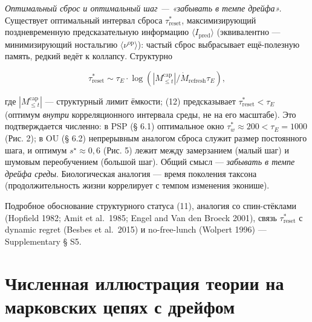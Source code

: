 \documentclass[pdflatex,sn-mathphys-ay]{sn-jnl}
\begin{document}
\emph{Оптимальный сброс и оптимальный шаг --- «забывать в темпе дрейфа».} Существует оптимальный интервал сброса \(\tau_{\text{reset}}^*\), максимизирующий поздневременную предсказательную информацию \(\langle I_{\text{pred}} \rangle\) (эквивалентно --- минимизирующий ностальгию \(\langle\nu^{\text{op}}\rangle\)): частый сброс выбрасывает ещё-полезную память, редкий ведёт к коллапсу. Структурно



\begin{equation}\tau_{\text{reset}}^* \sim \tau_E \cdot \log(|M_{\le t}^{\text{cap}}|/\dot{M}_{\text{refresh}} \tau_E), \tag{12}\end{equation}



где \(|M_{\le t}^{\text{cap}}|\) --- структурный лимит ёмкости; (12) предсказывает \(\tau_{\text{reset}}^* < \tau_E\) (оптимум \emph{внутри} корреляционного интервала среды, не на его масштабе). Это подтверждается численно: в PSP (§ 6.1) оптимальное окно \(\tau_w^* \approx 200 < \tau_E = 1000\) (Рис. 2); в OU (§ 6.2) непрерывным аналогом сброса служит размер постоянного шага, и оптимум \(s^\star \approx 0{,}6\) (Рис. 5) лежит между замерзанием (малый шаг) и шумовым переобучением (большой шаг). Общий смысл --- \emph{забывать в темпе дрейфа среды}. Биологическая аналогия --- время поколения таксона (продолжительность жизни коррелирует с темпом изменения эконише).



Подробное обоснование структурного статуса (11), аналогия со спин-стёклами (Hopfield 1982; Amit et al.~1985; Engel and Van den Broeck 2001), связь \(\tau_{\text{reset}}^*\) с dynamic regret (Besbes et al.~2015) и no-free-lunch (Wolpert 1996) --- Supplementary § S5.



\section{Численная иллюстрация теории на марковских цепях с дрейфом}\label{ux447ux438ux441ux43bux435ux43dux43dux430ux44f-ux438ux43bux43bux44eux441ux442ux440ux430ux446ux438ux44f-ux442ux435ux43eux440ux438ux438-ux43dux430-ux43cux430ux440ux43aux43eux432ux441ux43aux438ux445-ux446ux435ux43fux44fux445-ux441-ux434ux440ux435ux439ux444ux43eux43c}
\end{document}
